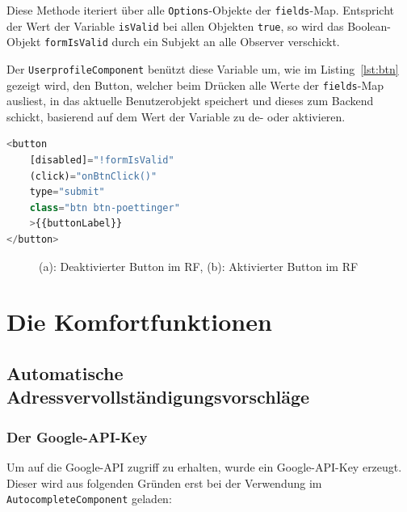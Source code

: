 Diese Methode iteriert über alle \texttt{Options}-Objekte der \texttt{fields}-Map. Entspricht der Wert der Variable \texttt{isValid} bei allen Objekten \texttt{true}, so wird das Boolean-Objekt \texttt{formIsValid} durch ein Subjekt an alle Observer verschickt.

Der \texttt{UserprofileComponent} benützt diese Variable um, wie im Listing~\ref{lst:btn} gezeigt wird, den Button, welcher beim Drücken alle Werte der \texttt{fields}-Map ausliest, in das aktuelle Benutzerobjekt speichert und dieses zum Backend schickt, basierend auf dem Wert der Variable zu de- oder aktivieren.

\begin{lstlisting}[caption={Der Button im \texttt{UserprofileComponent}, welcher de- oder aktiviert wird}, language=JavaScript,label={lst:btn}]
<button 
	[disabled]="!formIsValid" 
	(click)="onBtnClick()" 
	type="submit"
	class="btn btn-poettinger"
	>{{buttonLabel}}
</button>
\end{lstlisting}

\begin{figure}[H]
	\centering
	\qquad
	\caption{(a): Deaktivierter Button im RF, (b): Aktivierter Button im RF}%
\end{figure}

\section{Die Komfortfunktionen}
\subsection{Automatische Adressvervollständigungsvorschläge}
\subsubsection{Der Google-API-Key}
Um auf die Google-API zugriff zu erhalten, wurde ein Google-API-Key erzeugt. Dieser wird aus folgenden Gründen erst bei der Verwendung im \texttt{AutocompleteComponent} geladen:

